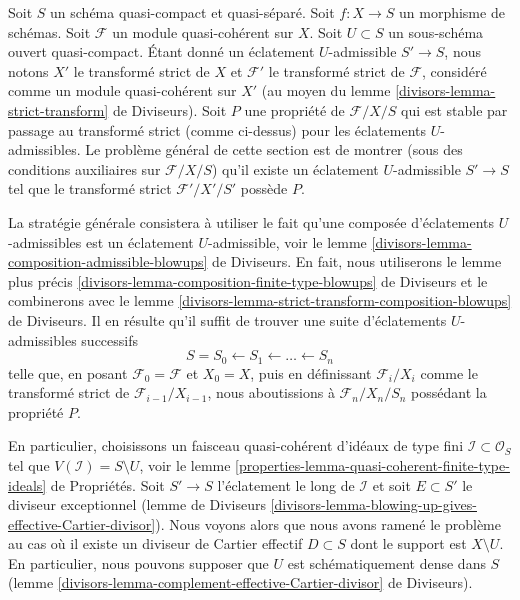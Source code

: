 \begin{remark}
\label{remark-successive-blowups}
Soit $S$ un schéma quasi-compact et quasi-séparé. Soit $f : X \to S$
un morphisme de schémas. Soit $\mathcal{F}$ un module quasi-cohérent sur $X$.
Soit $U \subset S$ un sous-schéma ouvert quasi-compact. Étant donné un éclatement $U$-admissible
$S' \to S$, nous notons $X'$ le transformé strict de $X$ et $\mathcal{F}'$
le transformé strict de $\mathcal{F}$, considéré comme un module quasi-cohérent
sur $X'$ (au moyen du lemme \ref{divisors-lemma-strict-transform} de Diviseurs).
Soit $P$ une propriété de $\mathcal{F}/X/S$ qui est stable par passage au transformé
strict (comme ci-dessus) pour les éclatements $U$-admissibles. Le problème général de
cette section est de montrer (sous des conditions auxiliaires sur $\mathcal{F}/X/S$)
qu'il existe un éclatement $U$-admissible $S' \to S$
tel que le transformé strict $\mathcal{F}'/X'/S'$ possède $P$.

\medskip\noindent
La stratégie générale consistera à utiliser le fait qu'une composée
d'éclatements $U$-admissibles est un éclatement $U$-admissible, voir le
lemme \ref{divisors-lemma-composition-admissible-blowups} de Diviseurs.
En fait, nous utiliserons le lemme plus précis
\ref{divisors-lemma-composition-finite-type-blowups} de Diviseurs
et le combinerons avec le
lemme \ref{divisors-lemma-strict-transform-composition-blowups} de Diviseurs.
Il en résulte qu'il suffit de trouver une suite d'éclatements $U$-admissibles
successifs
$$
S = S_0 \leftarrow S_1 \leftarrow \ldots \leftarrow S_n
$$
telle que, en posant $\mathcal{F}_0 = \mathcal{F}$ et $X_0 = X$, puis en définissant
$\mathcal{F}_i/X_i$ comme le transformé strict de
$\mathcal{F}_{i - 1}/X_{i - 1}$, nous
aboutissions à $\mathcal{F}_n/X_n/S_n$ possédant la propriété $P$.

\medskip\noindent
En particulier, choisissons un faisceau quasi-cohérent d'idéaux de type fini
$\mathcal{I} \subset \mathcal{O}_S$ tel que $V(\mathcal{I}) = S \setminus U$,
voir le lemme \ref{properties-lemma-quasi-coherent-finite-type-ideals} de Propriétés.
Soit $S' \to S$ l'éclatement le long de $\mathcal{I}$ et soit $E \subset S'$
le diviseur exceptionnel (lemme de Diviseurs
\ref{divisors-lemma-blowing-up-gives-effective-Cartier-divisor}).
Nous voyons alors que nous avons ramené le
problème au cas où il existe un diviseur de Cartier effectif
$D \subset S$ dont le support est $X \setminus U$. En particulier, nous pouvons
supposer que $U$ est schématiquement dense dans $S$
(lemme \ref{divisors-lemma-complement-effective-Cartier-divisor} de Diviseurs).


\end{remark}
